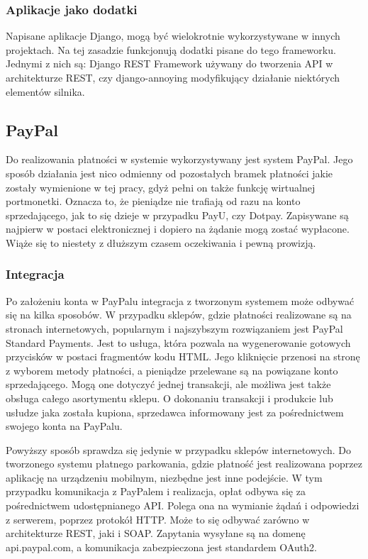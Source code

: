 \subsubsection*{Aplikacje jako dodatki}
Napisane aplikacje Django, mogą być wielokrotnie wykorzystywane w innych projektach. Na tej zasadzie funkcjonują dodatki pisane do tego frameworku. Jednymi z nich są: Django REST Framework używany do tworzenia API w architekturze REST, czy django-annoying modyfikujący działanie niektórych elementów silnika.

\subsection{PayPal}

Do realizowania płatności w systemie wykorzystywany jest system PayPal. Jego sposób działania jest nico odmienny od 
pozostałych bramek płatności jakie zostały wymienione w tej pracy, gdyż pełni on także 
funkcję wirtualnej portmonetki. Oznacza to, że pieniądze nie trafiają od razu 
na konto sprzedającego, jak to się dzieje w przypadku PayU, czy Dotpay. 
Zapisywane są najpierw w postaci elektronicznej i dopiero na żądanie mogą 
zostać wypłacone. Wiąże się to niestety z dłuższym czasem oczekiwania i pewną 
prowizją. 

\subsubsection*{Integracja}

Po założeniu konta w PayPalu integracja z tworzonym systemem może odbywać się 
na kilka sposobów. W przypadku sklepów, gdzie płatności realizowane są na 
stronach internetowych, popularnym i najszybszym rozwiązaniem jest PayPal 
Standard Payments. Jest to usługa, która pozwala na wygenerowanie gotowych 
przycisków w postaci fragmentów kodu HTML. Jego kliknięcie przenosi na stronę 
z wyborem metody płatności, a pieniądze przelewane są na powiązane konto 
sprzedającego. Mogą one dotyczyć jednej transakcji, ale możliwa jest także 
obsługa całego asortymentu sklepu. O dokonaniu transakcji i produkcie lub 
usłudze jaka została kupiona, sprzedawca informowany jest za pośrednictwem 
swojego konta na PayPalu.

Powyższy sposób sprawdza się jedynie w przypadku sklepów internetowych. Do 
tworzonego systemu płatnego parkowania, gdzie płatność jest realizowana poprzez 
aplikację na urządzeniu mobilnym, niezbędne jest inne podejście. W tym 
przypadku komunikacja z PayPalem i realizacja, opłat odbywa się za pośrednictwem 
udostępnianego API. Polega ona na wymianie żądań i odpowiedzi z serwerem, 
poprzez protokół HTTP. Może to się odbywać zarówno w architekturze REST, jaki i 
SOAP. Zapytania wysyłane są na domenę api.paypal.com, a komunikacja 
zabezpieczona jest standardem OAuth2.

